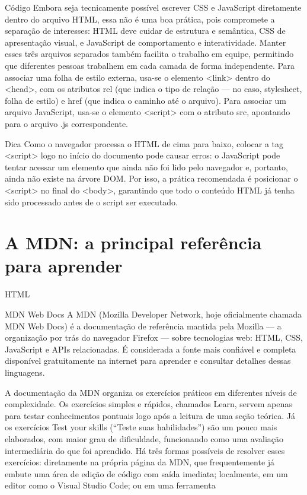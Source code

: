 \begin{codebox}{Código}
Embora seja tecnicamente possível escrever CSS e JavaScript diretamente dentro do
arquivo HTML, essa não é uma boa prática, pois compromete a separação de interesses:
HTML deve cuidar de estrutura e semântica, CSS de apresentação visual, e JavaScript
de comportamento e interatividade. Manter esses três arquivos separados também
facilita o trabalho em equipe, permitindo que diferentes pessoas trabalhem em cada
camada de forma independente.
Para associar uma folha de estilo externa, usa-se o elemento <link> dentro do
<head>, com os atributos rel (que indica o tipo de relação — no caso, stylesheet,
folha de estilo) e href (que indica o caminho até o arquivo). Para associar um arquivo
JavaScript, usa-se o elemento <script> com o atributo src, apontando para o arquivo
.js correspondente.
\end{codebox}

\begin{codebox}{Dica}
Como o navegador processa o HTML de cima para baixo, colocar a tag <script>
logo no início do documento pode causar erros: o JavaScript pode tentar acessar
um elemento que ainda não foi lido pelo navegador e, portanto, ainda não existe
na árvore DOM. Por isso, a prática recomendada é posicionar o <script> no final
do <body>, garantindo que todo o conteúdo HTML já tenha sido processado antes
de o script ser executado.
\end{codebox}

\section{A MDN: a principal referência para aprender}

\begin{codebox}{HTML}

\end{codebox}

\begin{infobox}{MDN Web Docs}
A MDN (Mozilla Developer Network, hoje oficialmente chamada MDN Web Docs) é a documentação de referência mantida pela Mozilla — a organização por trás do navegador Firefox — sobre tecnologias web: HTML, CSS, JavaScript e APIs relacionadas. É considerada a fonte mais confiável e completa disponível gratuitamente na internet para aprender e consultar detalhes dessas linguagens.
\end{infobox}

A documentação da MDN organiza os exercícios práticos em diferentes níveis de complexidade. Os exercícios simples e rápidos, chamados Learn, servem apenas para testar conhecimentos pontuais logo após a leitura de uma seção teórica. Já os exercícios Test your skills (“Teste suas habilidades”) são um pouco mais elaborados, com maior grau de dificuldade, funcionando como uma avaliação intermediária do que foi aprendido. Há três formas possíveis de resolver esses exercícios: diretamente na própria página da MDN, que frequentemente já embute uma área de edição de código com saída imediata; localmente, em um editor como o Visual Studio Code; ou em uma ferramenta

